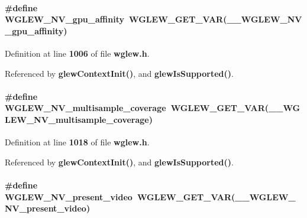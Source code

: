 \paragraph[{W\+G\+L\+E\+W\+\_\+\+N\+V\+\_\+gpu\+\_\+affinity}]{\setlength{\rightskip}{0pt plus 5cm}\#define W\+G\+L\+E\+W\+\_\+\+N\+V\+\_\+gpu\+\_\+affinity~{\bf W\+G\+L\+E\+W\+\_\+\+G\+E\+T\+\_\+\+V\+AR}({\bf \+\_\+\+\_\+\+W\+G\+L\+E\+W\+\_\+\+N\+V\+\_\+gpu\+\_\+affinity})}\label{wglew_8h_aed6184a211701172695f36bdb7f1f45e}


Definition at line {\bf 1006} of file {\bf wglew.\+h}.



Referenced by {\bf glew\+Context\+Init()}, and {\bf glew\+Is\+Supported()}.

\paragraph[{W\+G\+L\+E\+W\+\_\+\+N\+V\+\_\+multisample\+\_\+coverage}]{\setlength{\rightskip}{0pt plus 5cm}\#define W\+G\+L\+E\+W\+\_\+\+N\+V\+\_\+multisample\+\_\+coverage~{\bf W\+G\+L\+E\+W\+\_\+\+G\+E\+T\+\_\+\+V\+AR}({\bf \+\_\+\+\_\+\+W\+G\+L\+E\+W\+\_\+\+N\+V\+\_\+multisample\+\_\+coverage})}\label{wglew_8h_a78917dfa07b43408d98a1a423d56ce20}


Definition at line {\bf 1018} of file {\bf wglew.\+h}.



Referenced by {\bf glew\+Context\+Init()}, and {\bf glew\+Is\+Supported()}.

\paragraph[{W\+G\+L\+E\+W\+\_\+\+N\+V\+\_\+present\+\_\+video}]{\setlength{\rightskip}{0pt plus 5cm}\#define W\+G\+L\+E\+W\+\_\+\+N\+V\+\_\+present\+\_\+video~{\bf W\+G\+L\+E\+W\+\_\+\+G\+E\+T\+\_\+\+V\+AR}({\bf \+\_\+\+\_\+\+W\+G\+L\+E\+W\+\_\+\+N\+V\+\_\+present\+\_\+video})}\label{wglew_8h_a34e8351b77646343cbc5036b827d089e}


